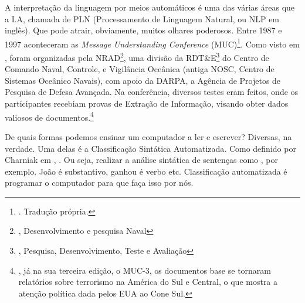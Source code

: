 A interpretação da linguagem por meios automáticos é uma das várias áreas que a I.A, chamada de PLN (Processamento de Linguagem Natural, ou NLP em inglês). Que pode atrair, obviamente, muitos olhares poderosos. Entre 1987 e 1997 aconteceram as \textit{Message Understanding Conference} (MUC)\footnote{. Tradução própria.}. Como visto em , foram organizadas pela NRAD\footnote{, Desenvolvimento e pesquisa Naval}, uma divisão da RDT\&E\footnote{, Pesquisa, Desenvolvimento, Teste e Avaliação} do Centro de Comando Naval, Controle, e Vigilância Oceânica (antiga NOSC, Centro de Sistemas Oceânico Navais), com apoio da DARPA, a Agência de Projetos de Pesquisa de Defesa Avançada. Na conferência, diversos testes eram feitos, onde os participantes recebiam provas de Extração de Informação, visando obter dados valiosos de documentos.\footnote{, já na sua terceira edição, o MUC-3, os documentos base se tornaram relatórios sobre terrorismo na América do Sul e Central, o que mostra a atenção política dada pelos EUA ao Cone Sul.}

De quais formas podemos ensinar um computador a ler e escrever? Diversas, na verdade. Uma delas é a Classificação Sintática Automatizada. Como definido por Charniak em , .
Ou seja, realizar a análise sintática de sentenças como , por exemplo.
João é substantivo, ganhou é verbo etc. Classificação automatizada é programar o computador para que faça isso por nós.

